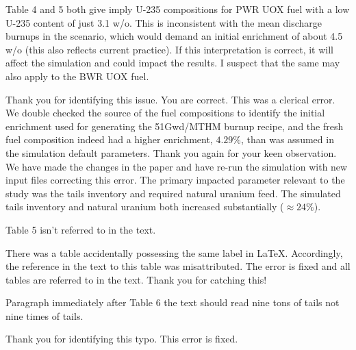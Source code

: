 \documentclass[answers,11pt]{exam}
\begin{document}
\begin{questions}
        \question Table 4 and 5 both give imply U-235 compositions for PWR UOX 
        fuel with a low U-235 content of just 3.1 w/o. This is inconsistent 
        with the mean discharge burnups in the scenario, which would demand an 
        initial enrichment of about 4.5 w/o (this also reflects current 
        practice). If this interpretation is correct, it will affect the 
        simulation and could impact the results. I suspect that the same may 
        also apply to the BWR UOX fuel. 
        \begin{solution}
                Thank you for identifying this issue. You are correct. This was 
                a clerical error.  We double checked the source of the fuel 
                compositions to identify the initial enrichment used for 
                generating the 51Gwd/MTHM burnup recipe, and the fresh fuel 
                composition indeed had a higher enrichment, $4.29 \%$, than was 
                assumed in the simulation default parameters. Thank you again 
                for your keen observation.  We have made the changes in the 
                paper and have re-run the simulation with new input files 
                correcting this error. The primary impacted parameter relevant 
                to the study was the tails inventory and required natural 
                uranium feed. The simulated tails inventory and natural uranium 
                both increased substantially ($\approx 24\%$).
        \end{solution}

        \question Table 5 isn't referred to in the text.

        \begin{solution}
                There was a table accidentally possessing the same label in 
                \LaTeX. Accordingly, the reference in the text  to this table 
                was misattributed. The error is fixed and all tables are 
                referred to in the text.  Thank you for catching this!
        \end{solution}

        \question Paragraph immediately after Table 6 the text should read nine 
        tons of tails not nine times of tails.
        \begin{solution}
                Thank you for identifying this typo. This error is fixed.
        \end{solution}


\end{questions}
\end{document}
